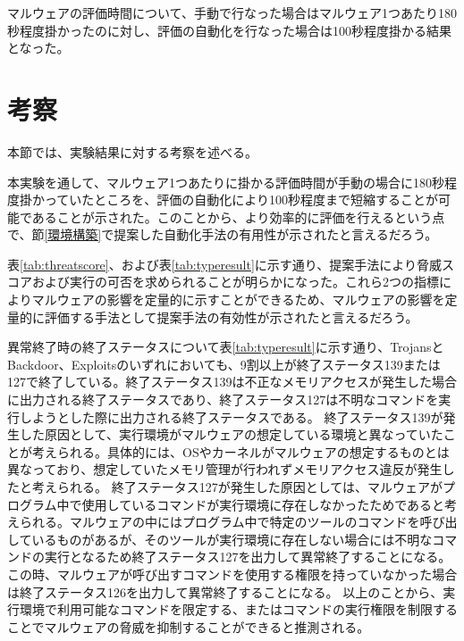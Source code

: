 \documentclass[12pt,a4paper,titlepage,report]{jsbook}
\begin{document}
マルウェアの評価時間について、手動で行なった場合はマルウェア1つあたり180秒程度掛かったのに対し、評価の自動化を行なった場合は100秒程度掛かる結果となった。

\section{考察}
本節では、実験結果に対する考察を述べる。

本実験を通して、マルウェア1つあたりに掛かる評価時間が手動の場合に180秒程度掛かっていたところを、評価の自動化により100秒程度まで短縮することが可能であることが示された。このことから、より効率的に評価を行えるという点で、節\ref{環境構築}で提案した自動化手法の有用性が示されたと言えるだろう。

表\ref{tab:threatscore}、および表\ref{tab:typeresult}に示す通り、提案手法により脅威スコアおよび実行の可否を求められることが明らかになった。これら2つの指標によりマルウェアの影響を定量的に示すことができるため、マルウェアの影響を定量的に評価する手法として提案手法の有効性が示されたと言えるだろう。

異常終了時の終了ステータスについて表\ref{tab:typeresult}に示す通り、TrojansとBackdoor、Exploitsのいずれにおいても、9割以上が終了ステータス139または127で終了している。終了ステータス139は不正なメモリアクセスが発生した場合に出力される終了ステータスであり、終了ステータス127は不明なコマンドを実行しようとした際に出力される終了ステータスである。
終了ステータス139が発生した原因として、実行環境がマルウェアの想定している環境と異なっていたことが考えられる。具体的には、OSやカーネルがマルウェアの想定するものとは異なっており、想定していたメモリ管理が行われずメモリアクセス違反が発生したと考えられる。
終了ステータス127が発生した原因としては、マルウェアがプログラム中で使用しているコマンドが実行環境に存在しなかったためであると考えられる。マルウェアの中にはプログラム中で特定のツールのコマンドを呼び出しているものがあるが、そのツールが実行環境に存在しない場合には不明なコマンドの実行となるため終了ステータス127を出力して異常終了することになる。この時、マルウェアが呼び出すコマンドを使用する権限を持っていなかった場合は終了ステータス126を出力して異常終了することになる。
以上のことから、実行環境で利用可能なコマンドを限定する、またはコマンドの実行権限を制限することでマルウェアの脅威を抑制することができると推測される。

\end{document}
